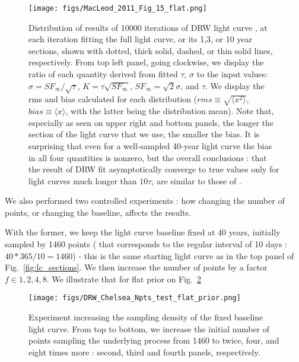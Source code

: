\documentclass[fleqn,usenatbib]{mnras}  %
\begin{document}

\begin{figure}
\texttt{[image: figs/MacLeod\_2011\_Fig\_15\_flat.png]}
\caption{Distribution of results of 10000 iterations of DRW light curve , at each iteration fitting the full light curve, or its 1,3, or 10 year sections, shown with dotted, thick solid,  dashed, or thin solid lines, respectively. From top left panel, going clockwise, we display the ratio of each quantity derived from fitted $\tau$, $\sigma$ to the input values:  $\hat{\sigma}  = SF_{\infty}  / \sqrt{\tau}$,  $K = \tau \sqrt{SF_{\infty}}$, $SF_{\infty} = \sqrt{2} \sigma$, and $\tau$. We display the rms and bias calculated for each distribution ($rms \equiv  \sqrt{\langle x^{2}\rangle}$, $bias \equiv \langle x \rangle $, with the latter being the distribution mean). Note that, especially as seen on upper right and bottom panels, the longer the section of the light curve that we use, the smaller the bias. It is surprising that even for a well-sampled 40-year light curve the bias in all four quantities is nonzero, but the overall conclusions : that the result of DRW fit asymptotically converge to true values only for light curves much longer than $10 \tau$,  are similar to those of \citep{macleod2011}. }
\label{fig:macleod11_15}
\end{figure}



We also performed two controlled experiments : how changing the number of points, or changing the baseline, affects the results.  

With the former, we keep the light curve  baseline fixed at 40 years,  initially sampled by 1460 points ( that corresponds to the regular interval of 10 days : $40 * 365 / 10  = 1460$) - this is the same starting light curve as in the top panel of Fig.~\ref{fig:lc_sections}. 
We then increase the number of points by a factor $f \in {1,2,4,8}$. We illustrate that for flat prior on Fig.~\ref{fig:Npts_experiment}

\begin{figure}
\texttt{[image: figs/DRW\_Chelsea\_Npts\_test\_flat\_prior.png]}
\caption{Experiment increasing the sampling density of the fixed baseline light curve. From top to bottom, we increase the initial number of points sampling the underlying process from 1460 to twice, four, and eight times more : second, third and fourth panels, respectively. }
\label{fig:Npts_experiment}
\end{figure}
\end{document}
